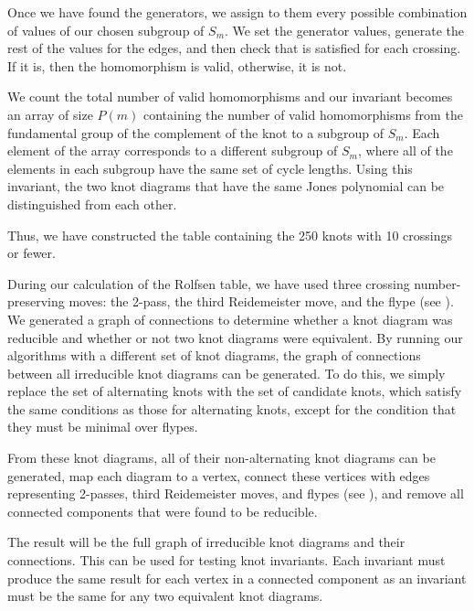 \begin{paper}

Once we have found the generators, we assign to them every possible
combination of values of our chosen subgroup of $S_m$.
We set the generator values, generate the rest of the values for the edges,
and then check that \eqBoth is satisfied for each crossing.
If it is, then the homomorphism is valid, otherwise, it is not.


We count the total number of valid homomorphisms and our invariant becomes an
array of size $P(m)$ containing the number of valid homomorphisms from the
fundamental group of the complement of the knot to a subgroup of $S_m$.
Each element of the array corresponds to a different subgroup of $S_m$, where
all of the elements in each subgroup have the same set of cycle lengths.
Using this invariant, the two knot diagrams that have the same Jones polynomial
can be distinguished from each other.


Thus, we have constructed the table containing the 250 knots with 10 crossings
or fewer.



During our calculation of the Rolfsen table, we have used three crossing
number-preserving moves: the 2-pass, the third Reidemeister move, and the flype
(see \figMoves).
We generated a graph of connections to determine whether a knot diagram was
reducible and whether or not two knot diagrams were equivalent.
By running our algorithms with a different set of knot diagrams, the graph of
connections between all irreducible knot diagrams can be generated.
To do this, we simply replace the set of alternating knots with the set of
candidate knots, which satisfy the same conditions as those for alternating
knots, except for the condition that they must be minimal over flypes.

From these knot diagrams, all of their non-alternating knot diagrams can be
generated, map each diagram to a vertex, connect these vertices with edges
representing 2-passes, third Reidemeister moves, and flypes (see \figMoves), and
remove all connected components that were found to be reducible.


The result will be the full graph of irreducible knot diagrams and their
connections.
This can be used for testing knot invariants.
Each invariant must produce the same result for each vertex in a connected
component as an invariant must be the same for any two equivalent knot diagrams.


\end{paper}
